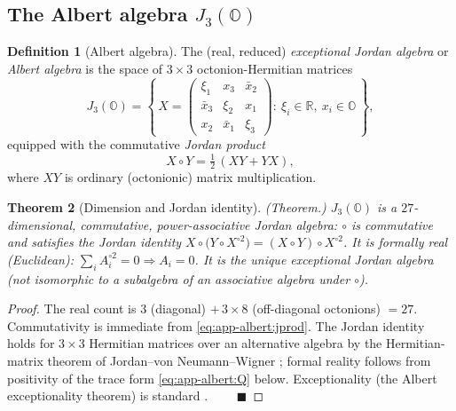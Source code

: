 \documentclass[11pt]{article}
\theoremstyle{plain}
\newtheorem{theorem}{Theorem}[section]
\theoremstyle{definition}
\newtheorem{definition}[theorem]{Definition}
\theoremstyle{remark}
\begin{document}
\subsection{The Albert algebra \texorpdfstring{$J_3(\mathbb O)$}{J3(O)}}
\label{sec:app-albert:jalg}

\begin{definition}[Albert algebra]\label{def:app-albert:jalg}
The (real, reduced) \emph{exceptional Jordan algebra} or \emph{Albert algebra} is
the space of $3\times3$ octonion-Hermitian matrices
\begin{equation}\label{eq:app-albert:Xform}
  J_3(\mathbb O)=
  \left\{\,
  X=\begin{pmatrix}
      \xi_1 & x_3 & \bar x_2\\
      \bar x_3 & \xi_2 & x_1\\
      x_2 & \bar x_1 & \xi_3
    \end{pmatrix}
  :\ \xi_i\in\mathbb R,\ x_i\in\mathbb O
  \,\right\},
\end{equation}
equipped with the commutative \emph{Jordan product}
\begin{equation}\label{eq:app-albert:jprod}
  X\circ Y=\tfrac12\,(XY+YX),
\end{equation}
where $XY$ is ordinary (octonionic) matrix multiplication.
\end{definition}

\begin{theorem}[Dimension and Jordan identity]\label{thm:app-albert:dim}
\textup{(Theorem.)}
$J_3(\mathbb O)$ is a $27$-dimensional, commutative, power-associative Jordan
algebra: $\circ$ is commutative and satisfies the Jordan identity
$X\circ\bigl(Y\circ X^{\circ 2}\bigr)=(X\circ Y)\circ X^{\circ 2}$. It is
\emph{formally real} (Euclidean): $\sum_i A_i^{\circ2}=0\Rightarrow A_i=0$. It is
the unique exceptional Jordan algebra (not isomorphic to a subalgebra of an
associative algebra under $\circ$).
\end{theorem}

\begin{proof}
The real count is $3$ (diagonal) $+\,3\times 8$ (off-diagonal octonions)
$=27$. Commutativity is immediate from \eqref{eq:app-albert:jprod}. The Jordan
identity holds for $3\times3$ Hermitian matrices over an alternative algebra by
the Hermitian-matrix theorem of Jordan--von Neumann--Wigner
\cite{JNW:1934,McCrimmon:2004}; formal reality follows from positivity of the
trace form \eqref{eq:app-albert:Q} below. Exceptionality (the Albert
exceptionality theorem) is standard \cite{Albert:1934,Schafer:1966}.
$\qquad\blacksquare$
\end{proof}
\end{document}
